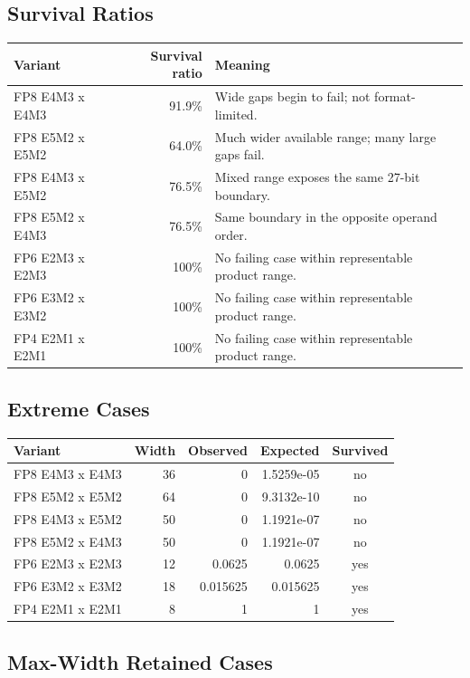 \documentclass[11pt]{article}
\begin{document}
\subsection{Survival Ratios}

\begin{tabularx}{\linewidth}{Y R Y}
\toprule
Variant & Survival ratio & Meaning \\
\midrule
FP8 E4M3 x E4M3 & 91.9\% & Wide gaps begin to fail; not format-limited. \\
FP8 E5M2 x E5M2 & 64.0\% & Much wider available range; many large gaps fail. \\
FP8 E4M3 x E5M2 & 76.5\% & Mixed range exposes the same 27-bit boundary. \\
FP8 E5M2 x E4M3 & 76.5\% & Same boundary in the opposite operand order. \\
FP6 E2M3 x E2M3 & 100\% & No failing case within representable product range. \\
FP6 E3M2 x E3M2 & 100\% & No failing case within representable product range. \\
FP4 E2M1 x E2M1 & 100\% & No failing case within representable product range. \\
\bottomrule
\end{tabularx}

\subsection{Extreme Cases}

\begin{tabularx}{\linewidth}{Y R R R C}
\toprule
Variant & Width & Observed & Expected & Survived \\
\midrule
FP8 E4M3 x E4M3 & 36 & 0 & 1.5259e-05 & no \\
FP8 E5M2 x E5M2 & 64 & 0 & 9.3132e-10 & no \\
FP8 E4M3 x E5M2 & 50 & 0 & 1.1921e-07 & no \\
FP8 E5M2 x E4M3 & 50 & 0 & 1.1921e-07 & no \\
FP6 E2M3 x E2M3 & 12 & 0.0625 & 0.0625 & yes \\
FP6 E3M2 x E3M2 & 18 & 0.015625 & 0.015625 & yes \\
FP4 E2M1 x E2M1 & 8 & 1 & 1 & yes \\
\bottomrule
\end{tabularx}

\subsection{Max-Width Retained Cases}
\end{document}
